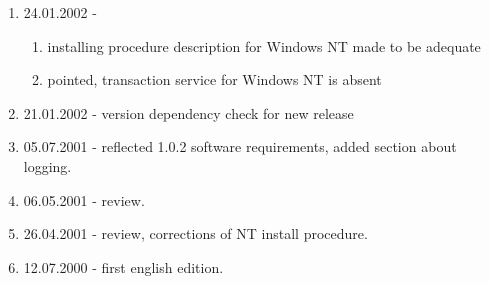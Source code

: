 \documentclass[10pt]{article}
\begin{document}
\begin{enumerate}
  \item 24.01.2002 - \begin{enumerate}
                     \item installing procedure description for Windows NT
                           made to be adequate 
                     \item pointed, transaction service for Windows NT is absent
                     \end{enumerate}
  \item 21.01.2002 - version dependency check for new release
  \item 05.07.2001 - reflected 1.0.2 software requirements, added section about logging.
  \item 06.05.2001 - review.
  \item 26.04.2001 - review, corrections of NT install procedure.
  \item 12.07.2000 - first english edition.
\end{enumerate}
\end{document}
